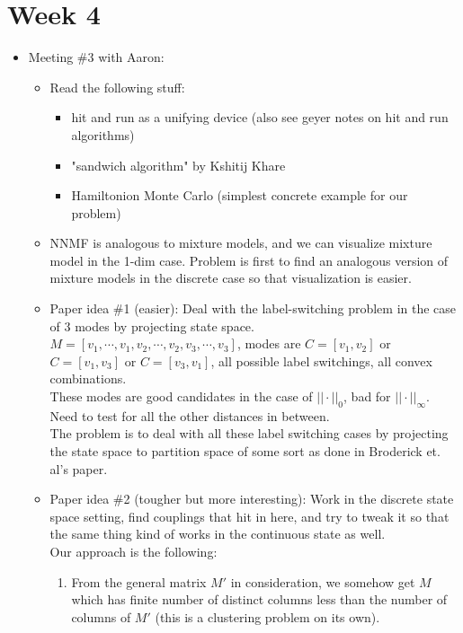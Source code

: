 \documentclass{article}
\begin{document}
	\section{Week 4}
	\begin{itemize}
		\item Meeting \#3 with Aaron:
			\begin{itemize}
					\item Read the following stuff:
						\begin{itemize}
							\item hit and run as a unifying device (also see geyer notes on hit and run algorithms)
							\item "sandwich algorithm" by Kshitij Khare
							\item Hamiltonion Monte Carlo (simplest concrete example for our problem)
						\end{itemize}
					\item NNMF is analogous to mixture models, and we can visualize mixture model in the 1-dim case. Problem is first to find an analogous version of mixture models in the discrete case so that visualization is easier.
					\item Paper idea \#1 (easier): Deal with the label-switching problem in the case of $3$ modes by projecting state space.\\
					$M = [v_1, \cdots, v_1, v_2, \cdots, v_2, v_3, \cdots, v_3]$, modes are $C = [v_1, v_2]$ or $C = [v_1, v_3]$ or $C = [v_3, v_1]$, all possible label switchings, all convex combinations.\\
					These modes are good candidates in the case of $||\cdot||_0$, bad for $||\cdot||_{\infty}$. Need to test for all the other distances in between.\\
					The problem is to deal with all these label switching cases by projecting the state space to partition space of some sort as done in Broderick et. al's paper.
					\item Paper idea \#2 (tougher but more interesting): Work in the discrete state space setting, find couplings that hit in here, and try to tweak it so that the same thing kind of works in the continuous state as well.\\
					Our approach is the following:
					\begin{enumerate}
						\item From the general matrix $M'$ in consideration, we somehow get $M$ which has finite number of distinct columns less than the number of columns of $M'$ (this is a clustering problem on its own).

\end{enumerate}
\end{itemize}
\end{itemize}
\end{document}

